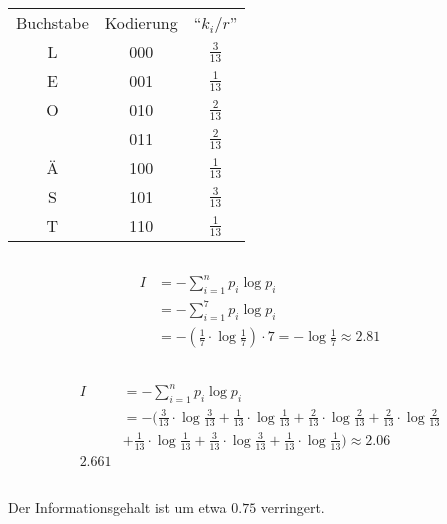 \documentclass{article}
\begin{document}
\section{}
\subsection{}
\begin{tabular}{c|c|c}
    Buchstabe&Kodierung&``$k_i/r$''\\
    L&000&$\frac{3}{13}$\\
    E&001&$\frac{1}{13}$\\
    O&010&$\frac{2}{13}$\\
     &011&$\frac{2}{13}$\\
    Ä&100&$\frac{1}{13}$\\
    S&101&$\frac{3}{13}$\\
    T&110&$\frac{1}{13}$
\end{tabular}
\subsection{}
\begin{align*}
    I &= -\sum_{i=1}^n p_i \log p_i\\
    &= -\sum_{i=1}^7 p_i \log p_i\\
    &= -(\frac{1}{7} \cdot \log\frac{1}{7}) \cdot 7 = -\log\frac{1}{7}
    \approx 2.81
\end{align*}
\subsection{}
\begin{align*}
    I &= -\sum_{i=1}^n p_i \log p_i\\
    &= -(\frac{3}{13}\cdot\log\frac{3}{13}
    +\frac{1}{13}\cdot\log\frac{1}{13}
    +\frac{2}{13}\cdot\log\frac{2}{13}
    +\frac{2}{13}\cdot\log\frac{2}{13}\\
    &+\frac{1}{13}\cdot\log\frac{1}{13}
    +\frac{3}{13}\cdot\log\frac{3}{13}
    +\frac{1}{13}\cdot\log\frac{1}{13})
    \approx 2.06\\2.661
\end{align*}
\subsection{}
Der Informationsgehalt ist um etwa $0.75$ verringert.
\subsection{}
\end{document}
